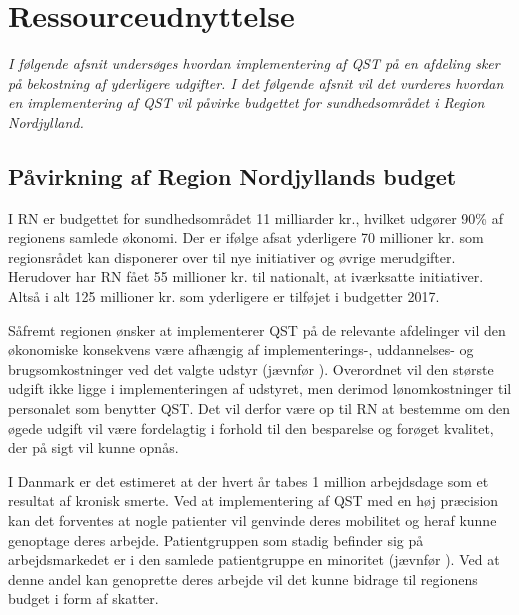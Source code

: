 \section{Ressourceudnyttelse}
\textit{I følgende afsnit undersøges hvordan implementering af QST på en afdeling sker på bekostning af yderligere udgifter. I det følgende afsnit vil det vurderes hvordan en implementering af QST vil påvirke budgettet for sundhedsområdet i Region Nordjylland.}

\subsection{Påvirkning af Region Nordjyllands budget}
I RN er budgettet for sundhedsområdet 11 milliarder kr., hvilket udgører 90\% af regionens samlede økonomi. \citep{RnBudget17}  Der er ifølge  afsat yderligere 70 millioner kr. som regionsrådet kan disponerer over til nye initiativer og øvrige merudgifter. Herudover har RN fået 55 millioner kr. til nationalt, at iværksatte initiativer. Altså i alt 125 millioner kr. som yderligere er tilføjet i budgetter 2017.

Såfremt regionen ønsker at implementerer QST på de relevante afdelinger vil den økonomiske konsekvens være afhængig af implementerings-, uddannelses- og brugsomkostninger ved det valgte udstyr (jævnfør ). Overordnet vil den største udgift ikke ligge i implementeringen af udstyret, men derimod lønomkostninger til personalet som benytter QST. Det vil derfor være op til RN at bestemme om den øgede udgift vil være fordelagtig i forhold til den besparelse og forøget kvalitet, der på sigt vil kunne opnås. 

I Danmark er det estimeret at der hvert år tabes 1 million arbejdsdage som et resultat af kronisk smerte. \citep{Eriksen2006} Ved at implementering af QST med en høj præcision kan det forventes at nogle patienter vil genvinde deres mobilitet og heraf kunne genoptage deres arbejde. Patientgruppen som stadig befinder sig på arbejdsmarkedet er i den samlede patientgruppe en minoritet (jævnfør ). Ved at denne andel kan genoprette deres arbejde vil det kunne bidrage til regionens budget i form af skatter.

